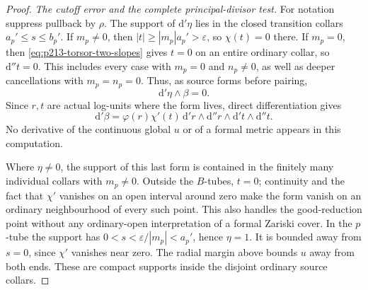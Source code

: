\begin{proof}
\emph{The cutoff error and the complete principal-divisor test.}
For notation suppress pullback by \(\rho\).
The support of \(\mathrm d'\eta\) lies in the closed
transition collars \(a_p'\leq s\leq b_p'\).
If \(m_p\neq0\), then \(|t|\geq|m_p|a_p'>\varepsilon\),
so \(\chi(t)=0\) there. If \(m_p=0\), then
\eqref{eq:p213-torsor-two-slopes} gives \(t=0\) on an
entire ordinary collar, so \(\mathrm d''t=0\).
This includes every case with \(m_p=0\) and
\(n_p\neq0\), as well as deeper cancellations with
\(m_p=n_p=0\). Thus, as source forms before pairing,
\[
 \mathrm d'\eta\wedge\beta=0.
\]
Since \(r,t\) are actual log-units where the form lives,
direct differentiation gives
\[
 \mathrm d'\beta
   =\varphi(r)\chi'(t)\,
       \mathrm d'r\wedge\mathrm d''r
                       \wedge\mathrm d't\wedge\mathrm d''t.
\]
No derivative of the continuous global \(u\) or of a
formal metric appears in this computation.

Where \(\eta\neq0\), the support of this last form is
contained in the finitely many individual collars
with \(m_p\neq0\). Outside the \(B\)-tubes, \(t=0\);
continuity and the fact that \(\chi'\) vanishes on an
open interval around zero make the form vanish on an
ordinary neighbourhood of every such point. This
also handles the good-reduction point without any
ordinary-open interpretation of a formal Zariski
cover. In the \(p\)-tube the support has
\(0<s<\varepsilon/|m_p|<a_p'\), hence \(\eta=1\).
It is bounded away from \(s=0\), since \(\chi'\)
vanishes near zero. The radial margin above bounds
\(u\) away from both ends. These are compact supports
inside the disjoint ordinary source collars.


\end{proof}
